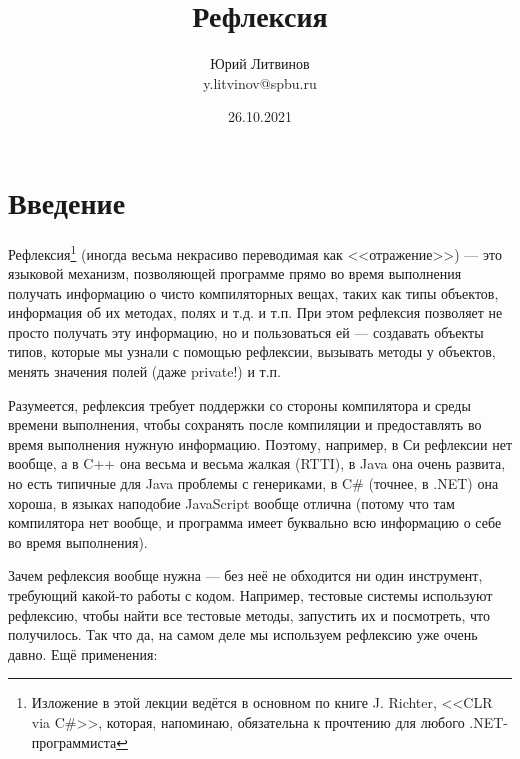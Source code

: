 \documentclass[a5paper]{article}
\title{Рефлексия}
\author{Юрий Литвинов\\\small{y.litvinov@spbu.ru}}
\date{26.10.2021}
\begin{document}
\maketitle
\thispagestyle{empty}

\section*{Введение}

Рефлексия\footnote{Изложение в этой лекции ведётся в основном по книге J. Richter, <<CLR via C\#>>, которая, напоминаю, обязательна к прочтению для любого .NET-программиста} (иногда весьма некрасиво переводимая как <<отражение>>) --- это языковой механизм, позволяющей программе прямо во время выполнения получать информацию о чисто компиляторных вещах, таких как типы объектов, информация об их методах, полях и т.д. и т.п. При этом рефлексия позволяет не просто получать эту информацию, но и пользоваться ей --- создавать объекты типов, которые мы узнали с помощью рефлексии, вызывать методы у объектов, менять значения полей (даже private!) и т.п. 

Разумеется, рефлексия требует поддержки со стороны компилятора и среды времени выполнения, чтобы сохранять после компиляции и предоставлять во время выполнения нужную информацию. Поэтому, например, в Си рефлексии нет вообще, а в C++ она весьма и весьма жалкая (RTTI), в Java она очень развита, но есть типичные для Java проблемы с генериками, в C\# (точнее, в .NET) она хороша, в языках наподобие JavaScript вообще отлична (потому что там компилятора нет вообще, и программа имеет буквально всю информацию о себе во время выполнения).

Зачем рефлексия вообще нужна --- без неё не обходится ни один инструмент, требующий какой-то работы с кодом. Например, тестовые системы используют рефлексию, чтобы найти все тестовые методы, запустить их и посмотреть, что получилось. Так что да, на самом деле мы используем рефлексию уже очень давно. Ещё применения:
\end{document}
